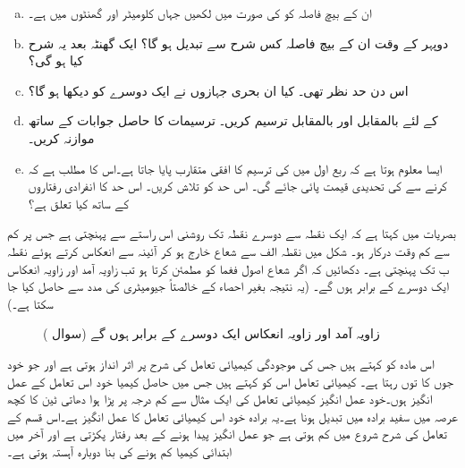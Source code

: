 \begin{enumerate}[a.]
\item
ان کے بیچ فاصلہ  کو  کی صورت میں لکھیں جہاں  کلومیٹر اور  گھنٹوں میں ہے۔
\item
دوپہر کے وقت ان کے بیچ فاصلہ کس شرح سے تبدیل ہو گا؟ ایک گھنٹہ بعد یہ شرح کیا ہو گی؟
\item
اس دن حد نظر  تھی۔ کیا ان بحری جہازوں نے ایک دوسرے کو دیکھا ہو گا؟ 
\item
{} کے لئے  بالمقابل  اور  بالمقابل  ترسیم کریں۔ ترسیمات کا حاصل جوابات کے ساتھ موازنہ کریں۔
\item
ایسا معلوم ہوتا ہے کہ ربع اول میں  کی ترسیم کا افقی متقارب پایا جاتا ہے۔اس کا مطلب ہے  کہ  کرنے سے  کی تحدیدی قیمت پائی جائے گی۔ اس حد کو تلاش کریں۔ اس حد کا انفرادی رفتاروں کے ساتھ کیا تعلق ہے؟
\end{enumerate}
بصریات میں  کہتا ہے کہ ایک نقطہ سے دوسرے نقطہ تک  روشنی اس راستے سے پہنچتی ہے جس پر کم سے کم وقت درکار ہو۔ شکل  میں نقطہ الف سے شعاع خارج ہو کر  آئینہ سے انعکاس کرتے ہوئے نقطہ ب تک پہنچتی ہے۔ دکھائیں کہ اگر شعاع اصول فغما کو مطمئن کرتا ہو تب زاویہ آمد اور زاویہ انعکاس ایک دوسرے کے برابر ہوں گے۔ (یہ نتیجہ بغیر احصاء کے خالصتاً جیومیٹری کی مدد سے حاصل کیا جا سکتا ہے۔)
\begin{figure}
\centering
{}
\caption{زاویہ آمد اور زاویہ انعکاس ایک دوسرے کے برابر ہوں گے (سوال )}
\label{شکل_سوال_استعمال_زاویہ_آمد_اور_انعکاس}
\end{figure}
%
\quad
{} اس مادہ کو کہتے ہیں جس کی موجودگی کیمیائی تعامل کی شرح پر اثر انداز ہوتی ہے اور جو خود جوں کا توں رہتا ہے۔  کیمیائی تعامل اس کو کہتے ہیں جس میں حاصل کیمیا خود اس تعامل کے عمل انگیز ہوں۔خود عمل انگیز کیمیائی تعامل کی ایک مثال   سے کم درجہ پر پڑا ہوا دھاتی ٹین کا کچھ عرصہ میں سفید برادہ میں تبدیل ہونا ہے۔یہ برادہ خود اس کیمیائی تعامل کا عمل انگیز ہے۔اس  قسم کے تعامل کی شرح شروع میں کم ہوتی ہے جو عمل انگیز پیدا ہونے کے بعد رفتار پکڑتی ہے اور آخر میں ابتدائی کیمیا کم ہونے کی بنا دوبارہ آہستہ ہوتی ہے۔
 
